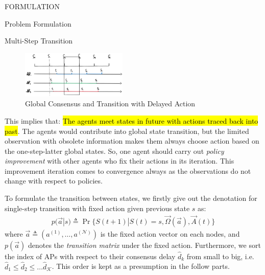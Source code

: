 \documentclass[10pt, conference, letterpaper]{IEEEtran}
\begin{document}
\begin{section}{FORMULATION}
\begin{subsection}{Problem Formulation}
\begin{subsubsection}{Multi-Step Transition}
                \begin{figure}[h]
                    \centering
                    \includegraphics[width=0.45\textwidth]{broadcast-trans.png}
                    \caption{Global Consensus and Transition with Delayed Action}
                    \label{fig:br-trans}
                \end{figure}

                This implies that: \hl{The agents meet states in future with actions traced back into past}. The agents would contribute into global state transition, but the limited observation with obsolete information makes them always choose action based on the one-step-latter global states. So, one agent should carry out \emph{policy improvement} with other agents who fix their actions in its iteration. This improvement iteration comes to convergence always as the observations do not change with respect to policies.

                To formulate the transition between states, we firstly give out the denotation for single-step transition with fixed action given previous state $s$ as:
                \begin{align}
                    p(\vec{a}|s) \triangleq \Pr\{ S(t+1)|S(t)=s, \vec{\Omega}(\vec{a}),\vec{A}(t) \}
                \end{align}
                where $\vec{a} \triangleq (a^{(1)}, \dots, a^{(\mathcal{N})})$ is the fixed action vector on each nodes, and $p(\vec{a})$ denotes the \emph{transition matrix} under the fixed action. Furthermore, we sort the index of APs with respect to their consensus delay $\hat{d}_k$ from small to big, i.e. $\hat{d}_1 \leq \hat{d}_2 \leq \dots \hat{d}_{\mathcal{K}}$. This order is kept as a presumption in the follow parts.


\end{subsubsection}
\end{subsection}
\end{section}
\end{document}

